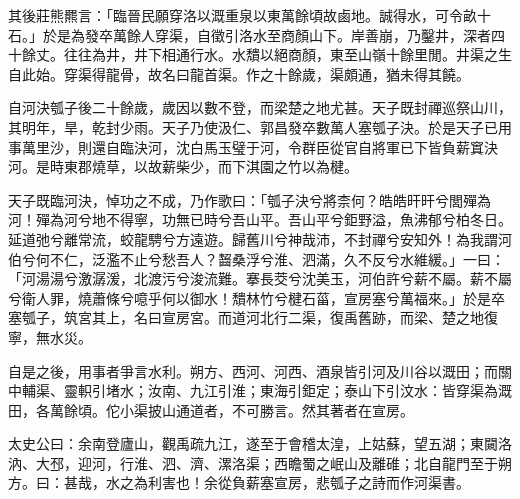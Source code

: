 \begin{pinyinscope}
其後莊熊羆言：「臨晉民願穿洛以溉重泉以東萬餘頃故鹵地。誠得水，可令畝十石。」於是為發卒萬餘人穿渠，自徵引洛水至商顏山下。岸善崩，乃鑿井，深者四十餘丈。往往為井，井下相通行水。水穨以絕商顏，東至山嶺十餘里閒。井渠之生自此始。穿渠得龍骨，故名曰龍首渠。作之十餘歲，渠頗通，猶未得其饒。

自河決瓠子後二十餘歲，歲因以數不登，而梁楚之地尤甚。天子既封禪巡祭山川，其明年，旱，乾封少雨。天子乃使汲仁、郭昌發卒數萬人塞瓠子決。於是天子已用事萬里沙，則還自臨決河，沈白馬玉璧于河，令群臣從官自將軍已下皆負薪窴決河。是時東郡燒草，以故薪柴少，而下淇園之竹以為楗。

天子既臨河決，悼功之不成，乃作歌曰：「瓠子決兮將柰何？皓皓旰旰兮閭殫為河！殫為河兮地不得寧，功無已時兮吾山平。吾山平兮鉅野溢，魚沸郁兮柏冬日。延道弛兮離常流，蛟龍騁兮方遠遊。歸舊川兮神哉沛，不封禪兮安知外！為我謂河伯兮何不仁，泛濫不止兮愁吾人？齧桑浮兮淮、泗滿，久不反兮水維緩。」一曰：「河湯湯兮激潺湲，北渡污兮浚流難。搴長茭兮沈美玉，河伯許兮薪不屬。薪不屬兮衛人罪，燒蕭條兮噫乎何以御水！穨林竹兮楗石菑，宣房塞兮萬福來。」於是卒塞瓠子，筑宮其上，名曰宣房宮。而道河北行二渠，復禹舊跡，而梁、楚之地復寧，無水災。

自是之後，用事者爭言水利。朔方、西河、河西、酒泉皆引河及川谷以溉田；而關中輔渠、靈軹引堵水；汝南、九江引淮；東海引鉅定；泰山下引汶水：皆穿渠為溉田，各萬餘頃。佗小渠披山通道者，不可勝言。然其著者在宣房。

太史公曰：余南登廬山，觀禹疏九江，遂至于會稽太湟，上姑蘇，望五湖；東闚洛汭、大邳，迎河，行淮、泗、濟、漯洛渠；西瞻蜀之岷山及離碓；北自龍門至于朔方。曰：甚哉，水之為利害也！余從負薪塞宣房，悲瓠子之詩而作河渠書。


\end{pinyinscope}